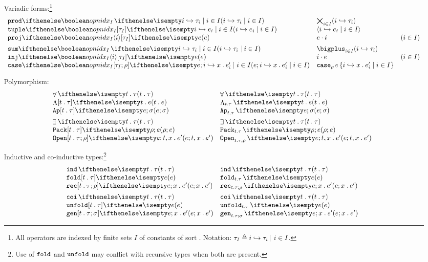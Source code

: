 \documentclass[11pt,twoside]{article}
\begin{document}
Variadic forms:\footnote{All operators are indexed by finite sets $I$ of constants of sort .  Notation: $\tau_I\eqdef \finmap{I}{i}{\tau}$.}
\begin{displaymath}
  \begin{array}{l@{\quad}l@{\quad}l}
    \vprodty<I><i>{\tau} & \vprodty*{\tau} \\
    \vtupleex<I>[\tau]{e} & \vtupleex*<I>{e} \\
    \vprojex<I><i>[\tau]{e} & \vprojex*<i>{e} & (i\in I) \\[1ex]

    \vsumty<I><i>{\tau}  & \vsumty*<I><i>{\tau} \\
    \vinjex<I><i>[\tau]{e} & \vinjex*<I><i>{e} & (i\in I) \\
    \vcaseex<I>[\rho][\tau]{e}{x}{e'}  & \vcaseex*<I>{e}{x}{e'}
  \end{array}
\end{displaymath}

Polymorphism:
\begin{displaymath}
  \begin{array}{l@{\quad}l@{\quad}l}
    \Allty{t}{\tau} & \Allty*{t}{\tau} \\
    \Lamex{t}[\tau]{e} & \Lamex*{t}{e} \\
    \Appex[t][\tau]{e}{\sigma} & \Appex*{e}{\sigma}\\[1ex]
    \Somety{t}{\tau}  & \Somety*{t}{\tau} \\
    \Packex[t][\tau]{\rho}{e} & \Packex*{\rho}{e} \\
    \Openex[t][\tau]{e}[\rho]{x}{e'} & \Openex*[t][\tau]{e}[\rho]{x}{e'}
  \end{array}
\end{displaymath}

Inductive and co-inductive types:\footnote{Use of $\Opn{fold}$ and $\Opn{unfold}$ may conflict with recursive types when both are present.}
\begin{displaymath}
  \begin{array}{l@{\quad}l@{\quad}l}
    \indty{t}{\tau} & \indty*{t}{\tau} \\
    \foldex[t][\tau]{e} & \foldex*{e} \\
    \recex[t][\tau][\rho]{e}{x}{e'} & \recex*{e}{x}{e'} \\[1ex]
    \coity{t}{\tau} & \coity*{t}{\tau} \\
    \unfoldex[t][\tau]{e} & \unfoldex*{e} \\
    \genex[t][\tau][\sigma]{e}{x}{e'} & \genex*{e}{x}{e'}
  \end{array}
\end{displaymath}
\end{document}
